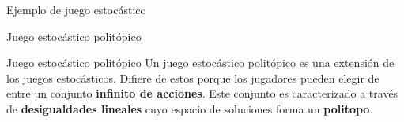 \documentclass{beamer}
\begin{document}
\begin{frame}{Ejemplo de juego estoc\'astico}

\end{frame}

\begin{frame}{Juego estoc\'astico polit\'opico}
	\pause
	\begin{block}{Juego estoc\'astico polit\'opico}
		Un juego estoc\'astico polit\'opico es una extensi\'on de los juegos estoc\'asticos. \pause Difiere de estos porque los jugadores pueden elegir de entre un conjunto \textbf{infinito de acciones}. \pause Este conjunto es caracterizado a trav\'es de \textbf{desigualdades lineales} cuyo espacio de soluciones forma un \textbf{politopo}.
	\end{block}
\end{frame}
\end{document}
